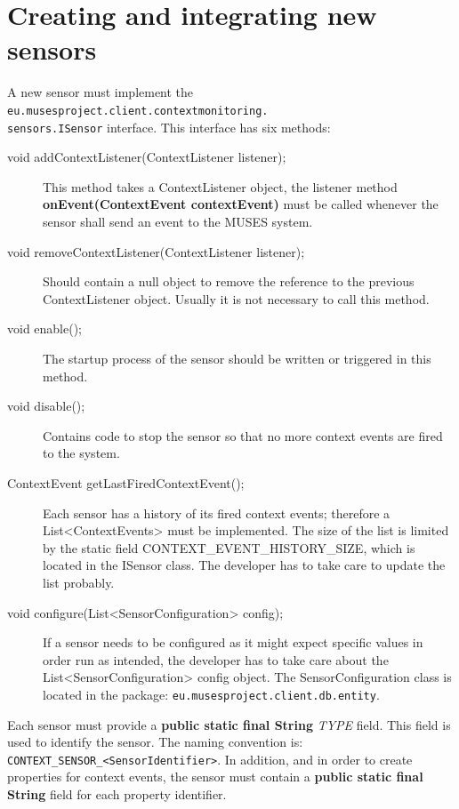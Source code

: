 \chapter{Creating and integrating new sensors}
\label{ch:sensors}

A new sensor must implement the \texttt{eu.musesproject.client.contextmonitoring.\\sensors.ISensor} interface. This interface has six methods:

\begin{description}
  \item[void addContextListener(ContextListener listener);] This method takes a ContextListener object, the listener method \textbf{onEvent(ContextEvent contextEvent)} must be called whenever the sensor shall send an event to the MUSES system.
  \item[void removeContextListener(ContextListener listener);] Should contain a null object to remove the reference to the previous ContextListener object. Usually it is not necessary to call this method.
  \item[void enable();] The startup process of the sensor should be written or triggered in this method.
  \item[void disable();] Contains code to stop the sensor so that no more context events are fired to the system.
  \item[ContextEvent getLastFiredContextEvent();] Each sensor has a history of its fired context events; therefore a List<ContextEvents> must be implemented. The size of the list is limited by the static field CONTEXT\_EVENT\_HISTORY\_SIZE, which is located in the ISensor class. The developer has to take care to update the list probably.
  \item[void configure(List<SensorConfiguration> config);] If a sensor needs to be configured as it might expect specific values in order run as intended, the developer has to take care about the List<SensorConfiguration> config object. The SensorConfiguration class is located in the package: \texttt{eu.musesproject.client.db.entity}.
\end{description}

Each sensor must provide a \textbf{public static final String} \textit{TYPE} field. This field is used to identify the sensor. The naming convention is:\\\texttt{CONTEXT\_SENSOR\_<SensorIdentifier>}.
In addition, and in order to create properties for context events, the sensor must contain a \textbf{public static final String} field for each property identifier.


